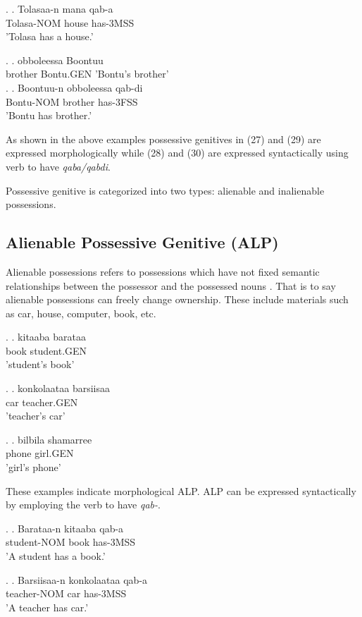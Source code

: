 \documentclass[11pt,a4paper]{article}
\begin{document}
	\ex.
	\ag.
	Tolasaa-n mana qab-a\\
	Tolasa-NOM house has-3MSS\\
	'Tolasa has a house.'
	
	\ex.
	\ag.
	obboleessa Boontuu\\
	brother Bontu.GEN
	'Bontu's brother'\\
		
	\ex.
	\ag.
	Boontuu-n obboleessa qab-di\\
	Bontu-NOM brother has-3FSS\\
	'Bontu has brother.'
	
	
	As shown in the above examples possessive genitives in (27) and (29) are expressed morphologically while (28) and (30) are expressed syntactically using verb to have \emph{qaba/qabdi}. 
	
	Possessive genitive is categorized into two types: alienable and inalienable possessions.
	
	\subsection{Alienable Possessive Genitive (ALP)}
	
	Alienable possessions refers to possessions which have not fixed semantic relationships between the 
	possessor and the possessed nouns \cite{gebregziabher2012alienable}. That is to say alienable possessions can freely change ownership. These include materials such as car, house, computer, book, etc.
	
	\ex.
	\ag.
	kitaaba barataa\\
	book student.GEN\\
	'student's book'
	
	\ex.
	\ag.
	konkolaataa barsiisaa\\
	car teacher.GEN\\
	'teacher's car'

	\ex.
	\ag.
	bilbila shamarree\\
	phone girl.GEN\\
	'girl's phone'
	
	
	These examples indicate morphological ALP. ALP can be expressed syntactically by employing the verb to have \emph{qab-}. 
	
		
	\ex.
	\ag.
	Barataa-n kitaaba qab-a\\
	student-NOM book has-3MSS\\
	'A student has a book.'
	
	\ex.
	\ag.
	Barsiisaa-n konkolaataa qab-a\\
	teacher-NOM car has-3MSS\\
	'A teacher has car.'
	
\end{document}
